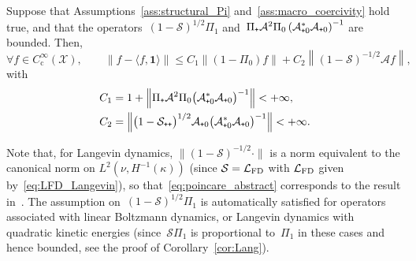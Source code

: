 \documentclass[10pt]{amsart}
\theoremstyle{definition}\newtheorem{defi}[theo]{Definition}\newtheorem{rema}[theo]{Remark}\newtheorem{exam}[theo]{Example}\newtheorem{exem}[theo]{Example}\newtheorem{nota}[theo]{Notation}
\newcommand{\rmc}{\mathrm{c}}
\newcommand{\cLs}{\mathcal{S}}
\newcommand{\cLa}{\mathcal{A}}
\newcommand{\cX}{\mathcal{X}}
\newcommand{\bfun}{\mathbf{1}}
\newcommand{\cLFD}{\mathcal{L}_{\rm FD}}
\newcommand{\subplus}{\textnormal{\texttt{+}}}
\renewcommand{\leq}{\leqslant}
\let\oldforall\forall
\renewcommand*{\forall}{\mathrel{\oldforall}}
\begin{document}
\begin{prop}\label{prop:Poincare_static}
Suppose that Assumptions~\ref{ass:structural_Pi} and~\ref{ass:macro_coercivity} hold true, and that the operators~$(1-\cLs)^{1/2} \Pi_{1}$ and~$\Pi_\subplus \cLa^2 \Pi_0 \left(\cLa_{\subplus 0}^*\cLa_{\subplus 0}\right)^{-1}$ are bounded. Then,
\begin{equation}\label{eq:poincare_abstract}
\forall f \in C_\rmc^\infty(\cX), \qquad \left\| f - \langle f,\bfun\rangle \right\| \leq C_1 \left\| \left(1-\Pi_0\right)f \right\| + C_2 \left\| (1-\cLs)^{-1/2} \cLa f\right\|,
\end{equation}
with
\begin{equation}\label{eq:expression_C1_C2}
\begin{aligned}
C_1 & = 1+\left\|\Pi_\subplus \cLa^2 \Pi_0 \big(\cLa_{\subplus 0}^*\cLa_{\subplus 0}\big)^{-1}\right\| < +\infty, \\
C_2 & = \left\| \big(1-\cLs_{\subplus\subplus}\big)^{1/2} \cLa_{\subplus 0}\big(\cLa_{\subplus 0}^*\cLa_{\subplus 0}\big)^{-1} \right\| < +\infty.
\end{aligned}
\end{equation}
\end{prop}

Note that, for Langevin dynamics, $\| (1-\cLs)^{-1/2} \cdot\|$ is a norm equivalent to the canonical norm on $L^2(\nu,H^{-1}(\kappa))$ (since $\cLs = \cLFD$ with $\cLFD$ given by~\eqref{eq:LFD_Langevin}), so that~\eqref{eq:poincare_abstract} corresponds to the result in~\cite[Theorem~1.2]{AM19}. The assumption on~$(1-\cLs)^{1/2} \Pi_{1}$ is automatically satisfied for operators associated with linear Boltzmann dynamics, or Langevin dynamics with quadratic kinetic energies (since~$\cLs \Pi_1$ is proportional to~$\Pi_1$ in these cases and hence bounded, see the proof of Corollary~\ref{cor:Lang}).
\end{document}

